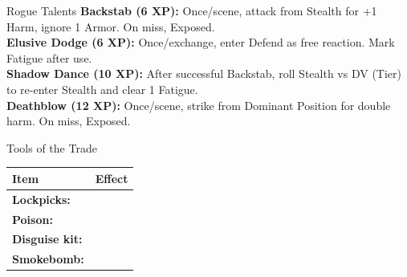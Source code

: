 \documentclass[10pt]{article}
\begin{document}
\begin{minipage}[t]{0.48\linewidth}
    \vspace{0.5em}
    
    \begin{charbox}{Rogue Talents}
        \textbf{Backstab (6 XP):} Once/scene, attack from Stealth for +1 Harm, ignore 1 Armor. On miss, Exposed.\\
        \textbf{Elusive Dodge (6 XP):} Once/exchange, enter Defend as free reaction. Mark Fatigue after use.\\
        \textbf{Shadow Dance (10 XP):} After successful Backstab, roll Stealth vs DV (Tier) to re-enter Stealth and clear 1 Fatigue.\\
        \textbf{Deathblow (12 XP):} Once/scene, strike from Dominant Position for double harm. On miss, Exposed.
    \end{charbox}
    
    \vspace{0.5em}
    
    \begin{charbox}{Tools of the Trade}
        \begin{tabular}{>{\bfseries}p{3cm} p{4.5cm}}
            \toprule
            \textbf{Item} & \textbf{Effect} \\
            \midrule
            Lockpicks: & \underline{\hspace{4cm}} \\
            Poison: & \underline{\hspace{4cm}} \\
            Disguise kit: & \underline{\hspace{4cm}} \\
            Smokebomb: & \underline{\hspace{4cm}} \\
            \bottomrule
        \end{tabular}
    \end{charbox}
\end{minipage}
\hfill
\end{document}
